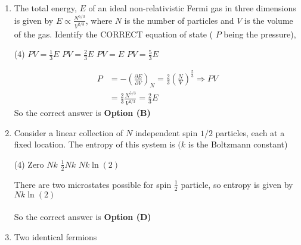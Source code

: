 \begin{enumerate}
\begin{tasks}(4)
\task[\textbf{A.}] $V_{F} \propto n^{2 / 3}$
\task[\textbf{B.}]  $V_{F} \propto n$
\task[\textbf{C.}] $V_{F} \propto n^{1 / 2}$
\task[\textbf{D.}] $V_{F} \propto n^{1 / 3}$
\end{tasks}
\begin{answer}
\begin{align*}
E_{F}&=\frac{1}{2} m V_{F}^{2} \quad \because E_{F} \propto n^{2 / 3} \Rightarrow V_{F}^{2} \propto n^{2 / 3} \Rightarrow V_{F} \propto n^{1 / 3}
\end{align*}
So the correct answer is \textbf{Option (D)}
\end{answer}
\item The total energy, $E$ of an ideal non-relativistic Fermi gas in three dimensions is given by $E \propto \frac{N^{5 / 3}}{V^{2 / 3}}$, where $N$ is the number of particles and $V$ is the volume of the gas. Identify the CORRECT equation of state ( $P$ being the pressure),
{}
\begin{tasks}(4)
\task[\textbf{A.}] $P V=\frac{1}{3} E$
\task[\textbf{B.}] $P V=\frac{2}{3} E$
\task[\textbf{C.}] $P V=E$
\task[\textbf{D.}] $P V=\frac{5}{3} E$
\end{tasks}
\begin{answer}
\begin{align*}
P&=-\left(\frac{\partial E}{\partial V}\right)_{N}=\frac{2}{3}\left(\frac{N}{V}\right)^{\frac{5}{3}} \Rightarrow P V\\&=\frac{2}{3} \frac{N^{5 / 3}}{V^{2 / 3}}=\frac{2}{3} E
\end{align*}
So the correct answer is \textbf{Option (B)}
\end{answer}
	\item Consider a linear collection of $N$ independent spin $1 / 2$ particles, each at a fixed location. The entropy of this system is $(k$ is the Boltzmann constant)
{}
\begin{tasks}(4)
\task[\textbf{A.}] Zero
\task[\textbf{B.}]  $N k$
\task[\textbf{C.}]  $\frac{1}{2} N k$
\task[\textbf{D.}] $N k \ln (2)$
\end{tasks}
\begin{answer}
There are two microstates possible for spin $\frac{1}{2}$ particle, so entropy is given by $N k \ln (2)$\\\\
So the correct answer is \textbf{Option (D)}
\end{answer}
	\item Two identical fermions

\end{enumerate}
